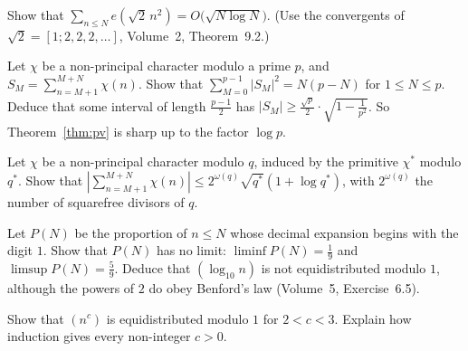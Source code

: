 \begin{exercise}[$\star\star$]\label{ex:weylsqrt2}
Show that $\sum_{n\le N}e(\sqrt2\,n^2)=O\bigl(\sqrt{N\log N}\bigr)$. (Use the convergents of $\sqrt2=[1;2,2,2,\dots]$, Volume~2, Theorem~9.2.)
\end{exercise}

\begin{exercise}[$\star\star$]\label{ex:pvsharp}
Let $\chi$ be a non-principal character modulo a prime $p$, and $S_M=\sum_{n=M+1}^{M+N}\chi(n)$. Show that $\sum_{M=0}^{p-1}|S_M|^2=N(p-N)$ for $1\le N\le p$. Deduce that some interval of length $\frac{p-1}2$ has
$|S_M|\ge\frac{\sqrt p}2\cdot\sqrt{1-\frac1{p^2}}$. So Theorem~\ref{thm:pv} is sharp up to the factor $\log p$.
\end{exercise}

\begin{exercise}[$\star\star$]\label{ex:pvnonprim}
Let $\chi$ be a non-principal character modulo $q$, induced by the primitive $\chi^*$ modulo $q^*$. Show that $|\sum_{n=M+1}^{M+N}\chi(n)|\le2^{\omega(q)}\sqrt{q^*}(1+\log q^*)$, with $2^{\omega(q)}$ the number of squarefree divisors of $q$.
\end{exercise}

\begin{exercise}\label{ex:logn}
Let $P(N)$ be the proportion of $n\le N$ whose decimal expansion begins with the digit $1$. Show that $P(N)$ has no limit: $\liminf P(N)=\frac19$ and $\limsup P(N)=\frac59$. Deduce that $(\log_{10}n)$ is not equidistributed modulo
$1$, although the powers of $2$ do obey Benford's law (Volume~5, Exercise~6.5).
\end{exercise}

\begin{exercise}[$\star\star\star$]\label{ex:nc23}
Show that $(n^c)$ is equidistributed modulo $1$ for $2<c<3$. Explain how induction gives every non-integer $c>0$.
\end{exercise}

